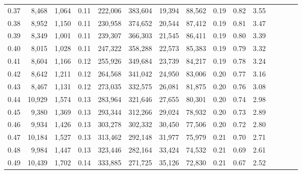 \begin{tabular}{rrrcrrrrrrrrrrr}
0.37 &   8,468 &  1,064 &                                       0.11 &  222,006 &  383,604 &   19,394 &   88,562 &  0.19 &  0.82 &                         3.55 \\
0.38 &   8,952 &  1,150 &                                       0.11 &  230,958 &  374,652 &   20,544 &   87,412 &  0.19 &  0.81 &                         3.47 \\
0.39 &   8,349 &  1,001 &                                       0.11 &  239,307 &  366,303 &   21,545 &   86,411 &  0.19 &  0.80 &                         3.39 \\
0.40 &   8,015 &  1,028 &                                       0.11 &  247,322 &  358,288 &   22,573 &   85,383 &  0.19 &  0.79 &                         3.32 \\
0.41 &   8,604 &  1,166 &                                       0.12 &  255,926 &  349,684 &   23,739 &   84,217 &  0.19 &  0.78 &                         3.24 \\
0.42 &   8,642 &  1,211 &                                       0.12 &  264,568 &  341,042 &   24,950 &   83,006 &  0.20 &  0.77 &                         3.16 \\
0.43 &   8,467 &  1,131 &                                       0.12 &  273,035 &  332,575 &   26,081 &   81,875 &  0.20 &  0.76 &                         3.08 \\
0.44 &  10,929 &  1,574 &                                       0.13 &  283,964 &  321,646 &   27,655 &   80,301 &  0.20 &  0.74 &                         2.98 \\
0.45 &   9,380 &  1,369 &                                       0.13 &  293,344 &  312,266 &   29,024 &   78,932 &  0.20 &  0.73 &                         2.89 \\
0.46 &   9,934 &  1,426 &                                       0.13 &  303,278 &  302,332 &   30,450 &   77,506 &  0.20 &  0.72 &                         2.80 \\
0.47 &  10,184 &  1,527 &                                       0.13 &  313,462 &  292,148 &   31,977 &   75,979 &  0.21 &  0.70 &                         2.71 \\
0.48 &   9,984 &  1,447 &                                       0.13 &  323,446 &  282,164 &   33,424 &   74,532 &  0.21 &  0.69 &                         2.61 \\
0.49 &  10,439 &  1,702 &                                       0.14 &  333,885 &  271,725 &   35,126 &   72,830 &  0.21 &  0.67 &                         2.52 \\

\end{tabular}
